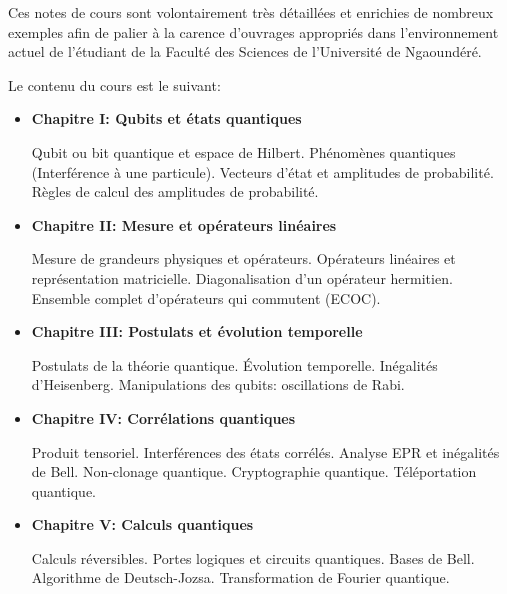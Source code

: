 \documentclass[12pt,a4paper,oneside,openany]{book}%
\numberwithin{equation}{section}
\numberwithin{figure}{section}
\numberwithin{table}{section}
\begin{document}
Ces notes de cours sont volontairement très détaillées et enrichies de nombreux
exemples afin de palier à la carence d'ouvrages appropriés dans l'environnement
actuel de l'étudiant de la Faculté des Sciences de l'Université de Ngaoundéré.

Le contenu du cours est le suivant:

\begin{itemize}
\item \textbf{Chapitre I: Qubits et états quantiques}

Qubit ou bit quantique et espace de Hilbert. Phénomènes quantiques (Interférence
à une particule). Vecteurs d'état et amplitudes de probabilité. Règles de calcul
des amplitudes de probabilité.

\item \textbf{Chapitre II: Mesure et opérateurs linéaires}

Mesure de grandeurs physiques et opérateurs. Opérateurs linéaires et
représentation matricielle. Diagonalisation d'un opérateur hermitien. Ensemble
complet d'opérateurs qui commutent (ECOC).

\item \textbf{Chapitre III: Postulats et évolution temporelle}

Postulats de la théorie quantique. Évolution temporelle. Inégalités
d'Heisenberg. Manipulations des qubits: oscillations de Rabi.

\item \textbf{Chapitre IV: Corrélations quantiques}

Produit tensoriel. Interférences des états corrélés. Analyse EPR et inégalités
de Bell. Non-clonage quantique. Cryptographie quantique. Téléportation
quantique.

\item \textbf{Chapitre V: Calculs quantiques}

Calculs réversibles. Portes logiques et circuits quantiques. Bases de Bell.
Algorithme de Deutsch-Jozsa. Transformation de Fourier quantique.
\end{itemize}

\mainmatter
%
%











% 
\end{document}
